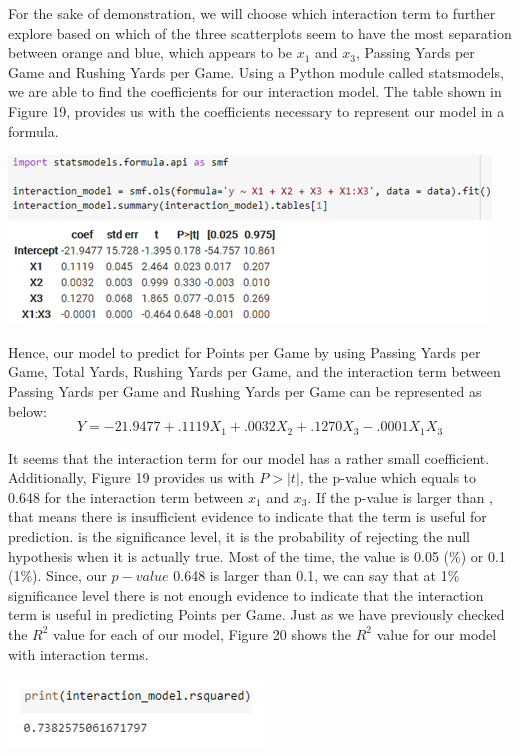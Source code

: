 \documentclass[a4paper,12pt]{report}
\begin{document}
For the sake of demonstration, we will choose which interaction term to further explore based on which of the three scatterplots seem to have the most separation between orange and blue, which appears to be $x_1$ and $x_3$, Passing Yards per Game and Rushing Yards per Game. Using a Python module called statsmodels, we are able to find the coefficients for our interaction model. The table shown in Figure 19, provides us with the coefficients necessary to represent our model in a formula.

\begin{center}
    \captionsetup{type=figure}
    \includegraphics[width=.9\linewidth]{media/statsmoduleformula.png}
\end{center}

Hence, our model to predict for Points per Game by using Passing Yards per Game, Total Yards, Rushing Yards per Game, and the interaction term between Passing Yards per Game and Rushing Yards per Game can be represented as below:
$$Y=-21.9477+.1119X_1+.0032X_2+.1270X_3-.0001X_1X_3$$

It seems that the interaction term for our model has a rather small coefficient. Additionally, Figure 19 provides us with $P>|t|$, the p-value which equals to 0.648 for the interaction term between $x_1$ and $x_3$. If the p-value is larger than , that means there is insufficient evidence to indicate that the term is useful for prediction.  is the significance level, it is the probability of rejecting the null hypothesis when it is actually true. Most of the time, the  value is 0.05 (\%) or 0.1 (1\%). Since, our $p-value$ 0.648 is larger than 0.1, we can say that at 1\% significance level there is not enough evidence to indicate that the interaction term is useful in predicting Points per Game. Just as we have previously checked the $R^2$  value for each of our model, Figure 20 shows the $R^2$ value for our model with interaction terms.

\begin{center}
    \captionsetup{type=figure}
    \includegraphics[width=.9\linewidth]{media/rsquaredmodel.png}
\end{center}
\end{document}
